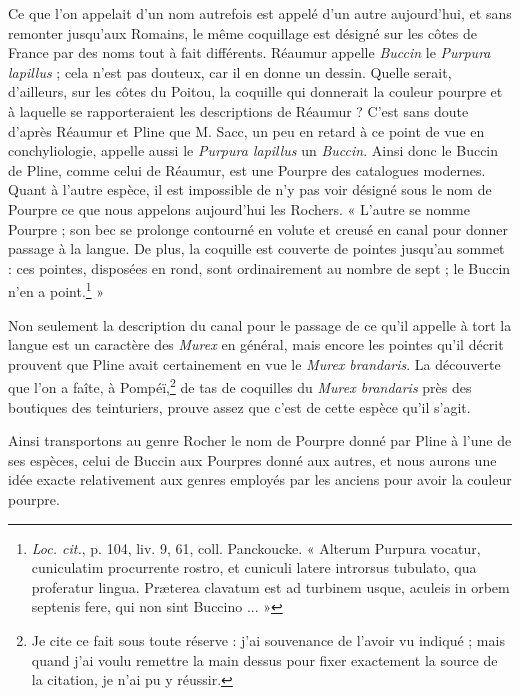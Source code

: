 \documentclass[a4paper, 11pt, oneside, polutonikogreek, french]{article}
\begin{document}
Ce que l'on appelait d'un nom autrefois est appelé d'un autre aujourd'hui, et sans remonter jusqu'aux Romains, le même coquillage est désigné sur les côtes de France par des noms tout à fait différents. Réaumur appelle \emph{Buccin} le \emph{Purpura lapillus} ; cela n'est pas douteux, car il en donne un dessin. Quelle serait, d'ailleurs, sur les côtes du Poitou, la coquille qui donnerait la couleur pourpre et à laquelle se rapporteraient les descriptions de Réaumur ? C'est sans doute d'après Réaumur et Pline que M. Sacc, un peu en retard à ce point de vue en conchyliologie, appelle aussi le \emph{Purpura lapillus} un \emph{Buccin}. Ainsi donc le Buccin de Pline, comme celui de Réaumur, est une Pourpre des catalogues modernes. Quant à l'autre espèce, il est impossible de n'y pas voir désigné sous le nom de Pourpre ce que nous appelons aujourd'hui les Rochers. « L'autre se nomme Pourpre ; son bec se prolonge contourné en volute et creusé en canal pour donner passage à la langue. De plus, la coquille est couverte de pointes jusqu'au sommet : ces pointes, disposées en rond, sont ordinairement au nombre de sept ; le Buccin n'en a point.\footnote{\emph{Loc. cit.}, p. 104, liv. 9, 61, coll. Panckoucke. « Alterum Purpura vocatur, cuniculatim procurrente rostro, et cuniculi latere introrsus tubulato, qua proferatur lingua. Præterea clavatum est ad turbinem usque, aculeis in orbem septenis fere, qui non sint Buccino ... »} »

Non seulement la description du canal pour le passage de ce qu'il appelle à tort la langue est un caractère des \emph{Murex} en général, mais encore les pointes qu'il décrit prouvent que Pline avait certainement en vue le \emph{Murex brandaris}. La découverte que l'on a faîte, à Pompéï,\footnote{Je cite ce fait sous toute réserve : j'ai souvenance de l'avoir vu indiqué ; mais quand j'ai voulu remettre la main dessus pour fixer exactement la source de la citation, je n'ai pu y réussir.} de tas de coquilles du \emph{Murex brandaris} près des boutiques des teinturiers, prouve assez que c'est de cette espèce qu'il s'agit.

Ainsi transportons au genre Rocher le nom de Pourpre donné par Pline à l'une de ses espèces, celui de Buccin aux Pourpres donné aux autres, et nous aurons une idée exacte relativement aux genres employés par les anciens pour avoir la couleur pourpre.
\end{document}
